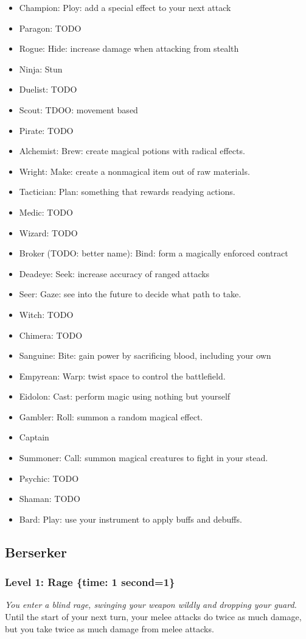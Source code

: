 \documentclass[12pt]{article}
\newcommand{\TIME}[1]{\{time: #1 second\if1=#1{}\else{s}\fi\}}
\newcommand{\Class}[1]{\pagebreak\subsection{#1}\label{#1}}
\newcommand{\Skill}[5]{\subsubsection{Level #1: #2 #3}\textit{#4}\\[1mm]#5}
\begin{document}
\begin{itemize}
\item Champion: Ploy: add a special effect to your next attack
\item Paragon: TODO
\item Rogue: Hide: increase damage when attacking from stealth
\item Ninja: Stun
\item Duelist: TODO
\item Scout: TDOO: movement based
\item Pirate: TODO
\item Alchemist: Brew: create magical potions with radical effects.
\item Wright: Make: create a nonmagical item out of raw materials.
\item Tactician: Plan: something that rewards readying actions.
\item Medic: TODO
\item Wizard: TODO
\item Broker (TODO: better name): Bind: form a magically enforced contract
\item Deadeye: Seek: increase accuracy of ranged attacks
\item Seer: Gaze: see into the future to decide what path to take.
\item Witch: TODO
\item Chimera: TODO
\item Sanguine: Bite: gain power by sacrificing blood, including your own
\item Empyrean: Warp: twist space to control the battlefield.
\item Eidolon: Cast: perform magic using nothing but yourself
\item Gambler: Roll: summon a random magical effect.
\item Captain
\item Summoner: Call: summon magical creatures to fight in your stead.
\item Psychic: TODO
\item Shaman: TODO
\item Bard: Play: use your instrument to apply buffs and debuffs.
\end{itemize}

\Class{Berserker}

\Skill{1}{Rage}{\TIME{1}}
{You enter a blind rage, swinging your weapon wildly and dropping your guard.}
{Until the start of your next turn, your melee attacks do twice as much damage, but you take twice as much damage from melee attacks.}
\end{document}
